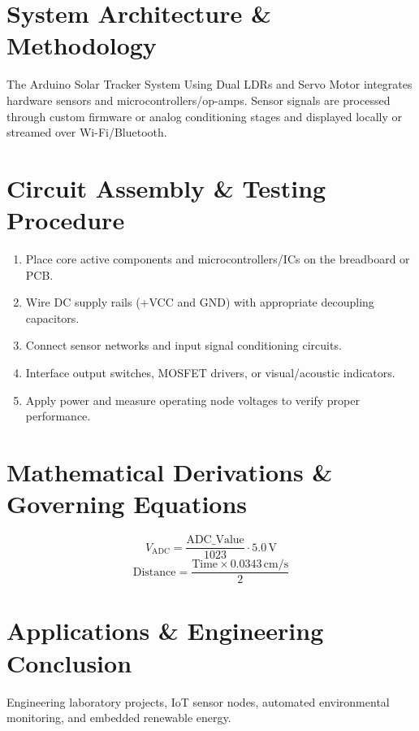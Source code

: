 \documentclass[11pt,a4paper]{article}
\begin{document}
\section{System Architecture \& Methodology}
The Arduino Solar Tracker System Using Dual LDRs and Servo Motor integrates hardware sensors and microcontrollers/op-amps. Sensor signals are processed through custom firmware or analog conditioning stages and displayed locally or streamed over Wi-Fi/Bluetooth.

\section{Circuit Assembly \& Testing Procedure}
\begin{enumerate}
    \item Place core active components and microcontrollers/ICs on the breadboard or PCB.
    \item Wire DC supply rails (+VCC and GND) with appropriate decoupling capacitors.
    \item Connect sensor networks and input signal conditioning circuits.
    \item Interface output switches, MOSFET drivers, or visual/acoustic indicators.
    \item Apply power and measure operating node voltages to verify proper performance.
\end{enumerate}

\section{Mathematical Derivations \& Governing Equations}
\begin{equation}
V_{\text{ADC}} = \frac{\text{ADC\_Value}}{1023} \cdot 5.0\,\text{V}
\end{equation}
\begin{equation}
\text{Distance} = \frac{\text{Time} \times 0.0343\,\text{cm/s}}{2}
\end{equation}

\section{Applications \& Engineering Conclusion}
Engineering laboratory projects, IoT sensor nodes, automated environmental monitoring, and embedded renewable energy.
\end{document}
